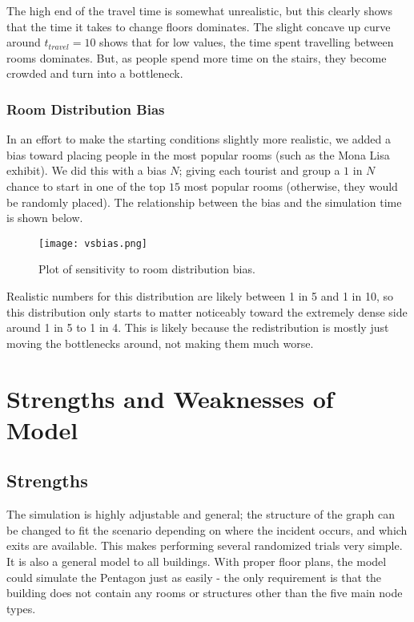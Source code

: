 \documentclass[12pt]{article}
\begin{document}
The high end of the travel time is somewhat unrealistic, but this clearly shows that the time it takes to change floors dominates. The slight concave up curve around $t_{travel} = 10$ shows that for low values, the time spent travelling between rooms dominates. But, as people spend more time on the stairs, they become crowded and turn into a bottleneck.

\subsubsection{Room Distribution Bias}
In an effort to make the starting conditions slightly more realistic, we added a bias toward placing people in the most popular rooms (such as the Mona Lisa exhibit). We did this with a bias $N$; giving each tourist and group a $1$ in $N$ chance to start in one of the top $15$ most popular rooms (otherwise, they would be randomly placed). The relationship between the bias and the simulation time is shown below.

\begin{figure}[H]
	\centering
	\texttt{[image: vsbias.png]}
    \caption{Plot of sensitivity to room distribution bias.}
\end{figure}

Realistic numbers for this distribution are likely between 1 in 5 and 1 in 10, so this distribution only starts to matter noticeably toward the extremely dense side around 1 in 5 to 1 in 4. This is likely because the redistribution is mostly just moving the bottlenecks around, not making them much worse.

\section{Strengths and Weaknesses of Model}
\subsection{Strengths}
The simulation is highly adjustable and general; the structure of the graph can be changed to fit the scenario depending on where the incident occurs, and which exits are available. This makes performing several randomized trials very simple. It is also a general model to all buildings. With proper floor plans, the model could simulate the Pentagon just as easily - the only requirement is that the building does not contain any rooms or structures other than the five main node types.\\
\end{document}
